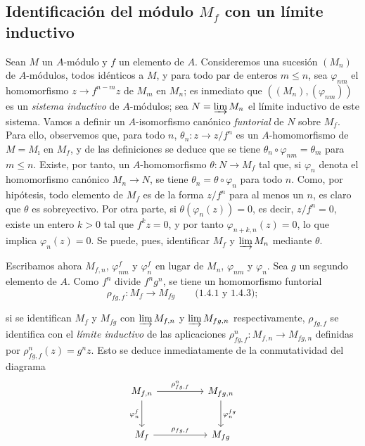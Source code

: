 \subsection{Identificación del módulo $M_f$ con un límite inductivo}
\label{subsection:0.1.6-fr}

\begin{env}[1.6.1]
\label{0.1.6.1-fr}
Sean $M$ un $A$-módulo y $f$ un elemento de $A$. Consideremos una sucesión
$(M_n)$ de $A$-módulos, todos idénticos a $M$, y para todo par de enteros
$m\leq n$, sea $\varphi_{nm}$ el homomorfismo $z\to f^{n-m}z$ de $M_m$
en $M_n$; es inmediato que $((M_n),(\varphi_{nm}))$ es un \emph{sistema
inductivo} de $A$-módulos; sea $N=\varinjlim M_n$ el límite inductivo de este
sistema. Vamos a definir un $A$-isomorfismo canónico \emph{funtorial} de
$N$ sobre $M_f$. Para ello, observemos que, para todo $n$,
$\theta_n:z\to z/f^n$ es un $A$-homomorfismo de $M=M_{\imath}$ en $M_f$, y
de las definiciones se deduce que se tiene $\theta_n\circ\varphi_{nm}=\theta_m$ para
$m\leq n$. Existe, por tanto, un $A$-homomorfismo $\theta:N\to M_f$ tal que, si
$\varphi_n$ denota el homomorfismo canónico $M_n\to N$, se tiene
$\theta_n=\theta\circ\varphi_n$ para todo $n$. Como, por hipótesis, todo elemento
de $M_f$ es de la forma $z/f^n$ para al menos un $n$, es claro que
$\theta$ es sobreyectivo. Por otra parte, si $\theta(\varphi_n(z))=0$, es decir,
$z/f^n=0$, existe un entero $k>0$ tal que $f^kz=0$, y por tanto
$\varphi_{n+k,n}(z)=0$, lo que implica $\varphi_n(z)=0$. Se puede, pues,
identificar $M_f$ y $\varinjlim M_n$ mediante $\theta$.
\end{env}

\begin{env}[1.6.2]
\label{0.1.6.2-fr}
Escribamos ahora $M_{f,n}$, $\varphi_{nm}^f$ y $\varphi_n^f$ en lugar de
$M_n$, $\varphi_{nm}$ y $\varphi_n$. Sea $g$ un segundo elemento de $A$. Como
$f^n$ divide $f^ng^n$, se tiene un homomorfismo funtorial
\[
  \rho_{fg,f}:M_f\longrightarrow M_{fg}\qquad\text{(1.4.1 y 1.4.3)};
\]


si se identifican $M_f$ y $M_{fg}$ con $\varinjlim M_{f,n}$ y
$\varinjlim M_{fg,n}$ respectivamente, $\rho_{fg,f}$ se identifica con el
\emph{límite inductivo} de las aplicaciones
$\rho_{fg,f}^n:M_{f,n}\to M_{fg,n}$ definidas por
$\rho_{fg,f}^n(z)=g^nz$. Esto se deduce inmediatamente de la
conmutatividad del diagrama
\[
\begin{tikzcd}[column sep=huge,row sep=large]
M_{f,n} \arrow[r,"\rho_{fg,f}^n"] \arrow[d,"\varphi_n^f"']
  & M_{fg,n} \arrow[d,"\varphi_n^{fg}"] \\
M_f \arrow[r,"\rho_{fg,f}"]
  & M_{fg}
\end{tikzcd}
\]
\end{env}

